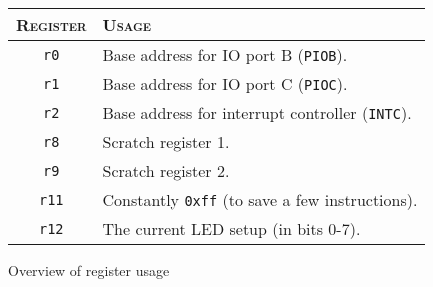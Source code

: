 \begin{figure}
\centering
\begin{tabular}{ c | l }
    \hline \hline
    \textsc{Register} & \textsc{Usage} \\ \hline
    \texttt{r0} &       Base address for IO port B (\texttt{PIOB}). \\
    \texttt{r1} &       Base address for IO port C (\texttt{PIOC}). \\
    \texttt{r2} &       Base address for interrupt controller
                        (\texttt{INTC}). \\
    \texttt{r8} &       Scratch register 1. \\
    \texttt{r9} &       Scratch register 2. \\
    \texttt{r11} &      Constantly \texttt{0xff} (to save a few
                        instructions). \\
    \texttt{r12} &      The current LED setup (in bits 0-7). \\
    \hline
\end{tabular}
\caption{Overview of register usage}
\label{tab:Registers}
\end{figure}
